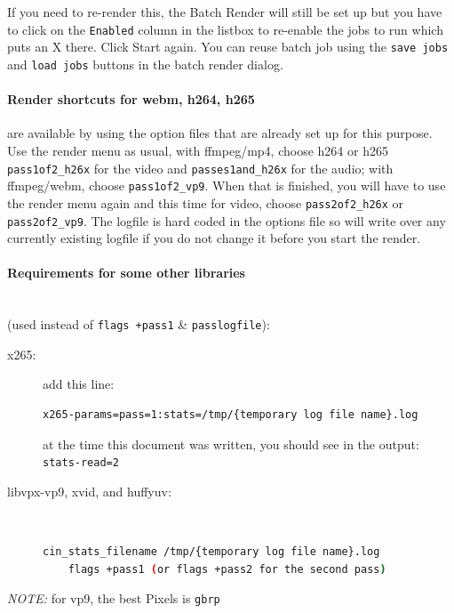 If you need to re-render this, the Batch Render will still be set up but you have to click on the \texttt{Enabled} column in the listbox to re-enable the jobs to run which puts an X there.  Click Start again. You can reuse batch job using the \texttt{save jobs} and \texttt{load jobs} buttons in the batch render dialog.

\paragraph{Render shortcuts for webm, h264, h265} are available by using the option files that are already set up for this purpose.  Use the render menu as usual, with ffmpeg/mp4, choose h264 or h265 \texttt{pass1of2\_h26x} for the video and \texttt{passes1and\_h26x} for the audio; 
with ffmpeg/webm, choose \texttt{pass1of2\_vp9}.  When that is finished, you will have to use the render menu again and this time for video, choose \texttt{pass2of2\_h26x} or \texttt{pass2of2\_vp9}.  The logfile is hard coded in the options file so will write over any currently existing logfile if you do not change it before you start the render.

\paragraph{Requirements for some other libraries} ~\\ (used instead of \texttt{flags +pass1} \& \texttt{passlogfile}):

\begin{description}
    \item[x265:] add this line:
    \begin{lstlisting}[language=bash]
x265-params=pass=1:stats=/tmp/{temporary log file name}.log
    \end{lstlisting}      
    at the time this document was written, you should see in the output: \\  \texttt{stats-read=2}
    
    \item[libvpx-vp9, xvid, and huffyuv:]~

    \begin{lstlisting}[language=bash]
    cin_stats_filename /tmp/{temporary log file name}.log
    flags +pass1 (or flags +pass2 for the second pass)
    \end{lstlisting}    
\end{description}

\noindent \textit{NOTE:} for vp9, the best Pixels is \texttt{gbrp}

